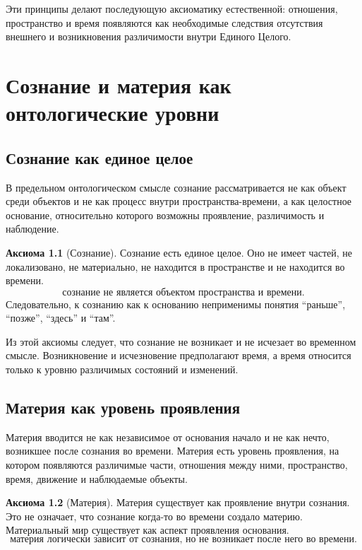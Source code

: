 \documentclass[12pt,a4paper,oneside]{book}
\theoremstyle{definition}
\newtheorem{axiom}{Аксиома}[chapter]
\theoremstyle{plain}
\theoremstyle{remark}
\begin{document}
Эти принципы делают последующую аксиоматику естественной: отношения, пространство и
время появляются как необходимые следствия отсутствия внешнего и возникновения
различимости внутри Единого Целого.

\chapter{Сознание и материя как онтологические уровни}

\section{Сознание как единое целое}

В предельном онтологическом смысле сознание рассматривается не как объект среди
объектов и не как процесс внутри пространства-времени, а как целостное основание,
относительно которого возможны проявление, различимость и наблюдение.

\begin{axiom}[Сознание]
Сознание есть единое целое. Оно не имеет частей, не локализовано, не материально,
не находится в пространстве и не находится во времени.
\[
\boxed{\text{сознание не является объектом пространства и времени.}}
\]
Следовательно, к сознанию как к основанию неприменимы понятия ``раньше'',
``позже'', ``здесь'' и ``там''.
\end{axiom}

Из этой аксиомы следует, что сознание не возникает и не исчезает во временном
смысле. Возникновение и исчезновение предполагают время, а время относится только
к уровню различимых состояний и изменений.

\section{Материя как уровень проявления}

Материя вводится не как независимое от основания начало и не как нечто, возникшее
после сознания во времени. Материя есть уровень проявления, на котором появляются
различимые части, отношения между ними, пространство, время, движение и наблюдаемые
объекты.

\begin{axiom}[Материя]
Материя существует как проявление внутри сознания. Это не означает, что сознание
когда-то во времени создало материю. Материальный мир существует как аспект
проявления основания.
\[
\boxed{\text{материя логически зависит от сознания, но не возникает после него во времени.}}
\]
\end{axiom}
\end{document}
